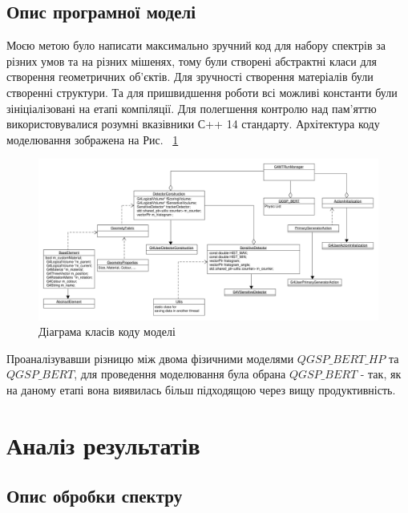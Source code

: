 \documentclass[a4paper, 14pt]{article}
\numberwithin{equation}{section}
\numberwithin{table}{section}
\begin{document}
\subsection{Опис програмної моделі}
Моєю метою було написати максимально зручний код для набору спектрів за різних умов та на різних мішенях, тому були створені абстрактні класи для створення геометричних об'єктів. Для зручності створення матеріалів були створенні структури. 
Та для пришвидшення роботи всі можливі константи були зініціалізовані на етапі компіляції. Для полегшення контролю над пам'яттю використовувалися розумні вказівники С++ 14 стандарту. Архітектура коду моделювання зображена на Рис. ~\ref{ris:s_classDiagram} 
\begin{figure}[hbt!]
	\centering \includegraphics[width=1\textwidth]{res/classDiagram.pdf}
	\caption{Діаграма класів коду моделі} 
	\label{ris:s_classDiagram}	
\end{figure} 
Проаналізувавши різницю між двома фізичними моделями $QGSP\_BERT\_HP$ та $QGSP\_BERT$, для проведення моделювання була обрана $QGSP\_BERT$ - так, як на даному етапі вона виявилась більш підходящою через вищу продуктивність.
\newpage 
\section{Аналіз результатів}
\setcounter{figure}{0}
\subsection{Опис обробки спектру}
\end{document}
